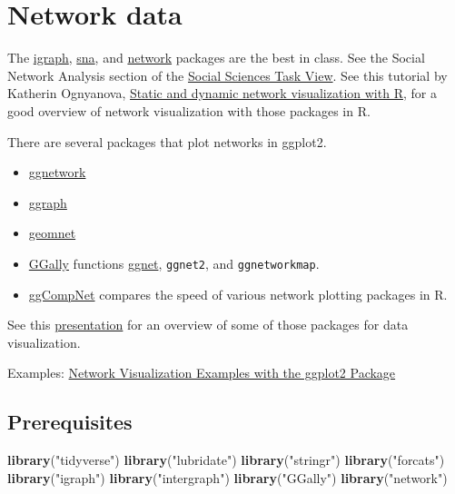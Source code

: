 \documentclass[]{book}
\newenvironment{Shaded}{\begin{snugshade}}{\end{snugshade}}
\newcommand{\KeywordTok}[1]{\textcolor[rgb]{0.13,0.29,0.53}{\textbf{#1}}}
\newcommand{\StringTok}[1]{\textcolor[rgb]{0.31,0.60,0.02}{#1}}
\newcommand{\NormalTok}[1]{#1}
\providecommand{\tightlist}{%
  \setlength{\itemsep}{0pt}\setlength{\parskip}{0pt}}
\theoremstyle{definition}
\theoremstyle{definition}
\theoremstyle{definition}
\theoremstyle{remark}
\begin{document}
\section{Network data}\label{network-data}

The \href{https://cran.r-project.org/package=igraph}{igraph},
\href{https://cran.r-project.org/package=sna}{sna}, and
\href{https://cran.r-project.org/package=network}{network} packages are
the best in class. See the Social Network Analysis section of the
\href{https://cran.r-project.org/web/views/SocialSciences.html}{Social
Sciences Task View}. See this tutorial by Katherin Ognyanova,
\href{https://rpubs.com/kateto/netviz}{Static and dynamic network
visualization with R}, for a good overview of network visualization with
those packages in R.

There are several packages that plot networks in ggplot2.

\begin{itemize}
\tightlist
\item
  \href{https://cran.r-project.org/package=ggnetwork}{ggnetwork}
\item
  \href{https://cran.r-project.org/package=ggraph}{ggraph}
\item
  \href{https://cran.r-project.org/package=geomnet}{geomnet}
\item
  \href{https://cran.r-project.org/package=GGally}{GGally} functions
  \href{https://ggobi.github.io/ggally/rd.html\#ggnet}{ggnet},
  \texttt{ggnet2}, and \texttt{ggnetworkmap}.
\item
  \href{https://cran.r-project.org/package=ggCompNet}{ggCompNet}
  compares the speed of various network plotting packages in R.
\end{itemize}

See this
\href{http://curleylab.psych.columbia.edu/netviz/netviz1.html\#/12}{presentation}
for an overview of some of those packages for data visualization.

Examples:
\href{https://cran.r-project.org/web/packages/ggCompNet/vignettes/examples-from-paper.html}{Network
Visualization Examples with the ggplot2 Package}

\subsection*{Prerequisites}\label{prerequisites-5}

\begin{Shaded}
\begin{Highlighting}[]
\KeywordTok{library}\NormalTok{(}\StringTok{"tidyverse"}\NormalTok{)}
\KeywordTok{library}\NormalTok{(}\StringTok{"lubridate"}\NormalTok{)}
\KeywordTok{library}\NormalTok{(}\StringTok{"stringr"}\NormalTok{)}
\KeywordTok{library}\NormalTok{(}\StringTok{"forcats"}\NormalTok{)}
\KeywordTok{library}\NormalTok{(}\StringTok{"igraph"}\NormalTok{)}
\KeywordTok{library}\NormalTok{(}\StringTok{"intergraph"}\NormalTok{)}
\KeywordTok{library}\NormalTok{(}\StringTok{"GGally"}\NormalTok{)}
\KeywordTok{library}\NormalTok{(}\StringTok{"network"}\NormalTok{)}
\end{Highlighting}
\end{Shaded}
\end{document}
